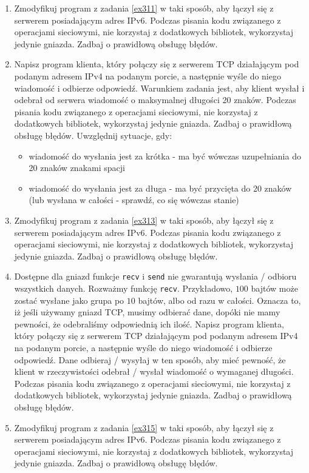 \documentclass{article}
\begin{document}
\begin{enumerate}[label=\textbf{3.\arabic*}]
    \item Zmodyfikuj program z zadania \ref{ex311} w taki sposób,  aby łączył się z serwerem posiadającym adres IPv6. Podczas pisania kodu związanego z operacjami sieciowymi, nie korzystaj z dodatkowych bibliotek, wykorzystaj jedynie gniazda. Zadbaj o prawidłową obsługę błędów. 
    
    \item \label{ex313} Napisz program klienta, który połączy się z serwerem TCP działającym pod podanym adresem IPv4 na podanym porcie, a następnie wyśle do niego wiadomość i odbierze odpowiedź. Warunkiem zadania jest, aby klient wysłał i odebrał od serwera wiadomość o maksymalnej długości 20 znaków. Podczas pisania kodu związanego z operacjami sieciowymi, nie korzystaj z dodatkowych bibliotek, wykorzystaj jedynie gniazda. Zadbaj o prawidłową obsługę błędów.  Uwzględnij sytuacje, gdy:
    \begin{itemize}
    \item wiadomość do wysłania jest za krótka - ma być wówczas uzupełniania do 20 znaków znakami spacji
    \item wiadomość do wysłania jest za długa - ma być przycięta do 20 znaków (lub wysłana w całości - sprawdź, co się wówczas stanie)
    \end{itemize}
    
    \item Zmodyfikuj program z zadania \ref{ex313} w taki sposób,  aby łączył się z serwerem posiadającym adres IPv6. Podczas pisania kodu związanego z operacjami sieciowymi, nie korzystaj z dodatkowych bibliotek, wykorzystaj jedynie gniazda. Zadbaj o prawidłową obsługę błędów. 
    
    \item \label{ex315} Dostępne dla gniazd funkcje \texttt{recv} i \texttt{send} nie gwarantują wysłania / odbioru wszystkich danych. Rozważmy funkcję \texttt{recv}. Przykładowo, $100$ bajtów może zostać wysłane jako grupa po $10$ bajtów, albo od razu w całości. Oznacza to, iż jeśli używamy gniazd TCP, musimy odbierać dane, dopóki nie mamy pewności, że odebraliśmy odpowiednią ich ilość. Napisz program klienta, który połączy się z serwerem TCP działającym pod podanym adresem IPv4 na podanym porcie, a następnie wyśle do niego wiadomość i odbierze odpowiedź. Dane odbieraj / wysyłaj w ten sposób, aby mieć pewność, że klient w rzeczywistości odebrał / wysłał wiadomość o wymaganej długości. Podczas pisania kodu związanego z operacjami sieciowymi, nie korzystaj z dodatkowych bibliotek, wykorzystaj jedynie gniazda. Zadbaj o prawidłową obsługę błędów. 
    
    \item Zmodyfikuj program z zadania \ref{ex315} w taki sposób,  aby łączył się z serwerem posiadającym adres IPv6. Podczas pisania kodu związanego z operacjami sieciowymi, nie korzystaj z dodatkowych bibliotek, wykorzystaj jedynie gniazda. Zadbaj o prawidłową obsługę błędów. 
   
\end{enumerate}
\end{document}
